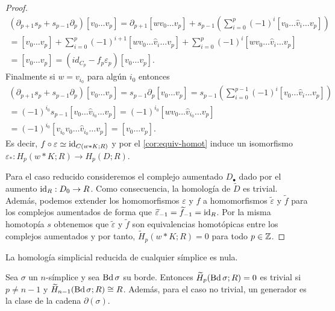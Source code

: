 \begin{proof}
	\begin{gather*}
		(\partial_{p+1}s_{p}+ s_{p-1}\partial_{p})[v_{0}\ldots v_{p}] =\partial_{p+1}
		[wv_{0}\ldots v_{p}]+s_{p-1}\left(\sum_{i=0}^{p}(-1)^{i}[v_{0}\ldots\hat{v}_{i}
		\ldots v_{p}]\right) \\ =[v_{0}\ldots v_{p}]+\sum_{i=0}^{p}(-1)^{i+1}[wv_{0}\ldots
		\hat{v}_{i}\ldots v_{p}]+\sum_{i=0}^{p}(-1)^{i}[wv_{0}\ldots\hat{v}_{i}\ldots
		v_{p}] \\ =[v_{0}\ldots v_{p}]=(id_{C_{p}}-f_{p}\varepsilon_{p})[v_{0}\ldots
		v_{p}].
	\end{gather*}
	Finalmente si \(w = v_{i_0}\) para algún \(i_{0}\) entonces
	\begin{gather*}
		(\partial_{p+1}s_{p}+s_{p-1}\partial_{p})[v_{0}\ldots v_{p}]=s_{p-1}\partial_{p}
		[v_{0}\ldots v_{p}] =s_{p-1}\left( \sum_{i=0}^{p-1}(-1)^{i}[v_{0}\ldots \hat{v}
		_{i}\ldots v_{p}] \right) \\ =(-1)^{i_0}s_{p-1}[v_{0}\ldots \hat{v}_{i_0}\ldots
		v_{p}] =(-1)^{i_0}[wv_{0}\ldots \hat{v}_{i_0}\ldots v_{p}] \\ =(-1)^{i_0}[v_{i_0}
		v_{0}\ldots \hat{v}_{i_0}\ldots v_{p}] =[v_{0}\ldots v_{p}].
	\end{gather*}
	Es decir, \(f \circ \varepsilon \simeq \operatorname{id}_{C(w \ast K;R)}\) y por el
	\autoref{cor:equiv-homot} induce un isomorfismo
	\(\varepsilon_{*}: H_{p}(w \ast K;R) \to H_{p}(D;R)\).
	
	Para el caso reducido consideremos el complejo aumentado \(D_{\bullet}\) dado
	por el aumento \(\operatorname{id}_{R}: D_{0}\to R\). Como consecuencia, la homología de
	\(\widetilde{D}\) es trivial. Además, podemos extender los homomorfismos
	\(\varepsilon\) y \(f\) a homomorfismos \(\widetilde{\varepsilon}\) y
	\(\widetilde{f}\) para los complejos aumentados de forma que
	\(\widetilde{\varepsilon}_{-1}= \widetilde{f}_{-1}= \operatorname{id}_{R}\). Por la misma homotopía
	\(s\) obtenemos que \(\widetilde{\varepsilon}\) y \(\widetilde{f}\) son equivalencias
	homotópicas entre los complejos aumentados y por tanto,
	\(\widetilde{H}_{p}(w \ast K;R) = 0\) para todo \(p \in \mathbb{Z}\).
\end{proof}
\begin{corolario}
	\label{cor:cono-nulo} La homología simplicial reducida de cualquier símplice es
	nula.
\end{corolario}
\begin{corolario}
	Sea \(\sigma\) un \(n\)-símplice y sea \(\operatorname{Bd} \sigma\) su borde. Entonces
	\(\widetilde{H}_{p}(\operatorname{Bd} \sigma;R) = 0\) es trivial si \(p \neq n-1\) y
	\(\widetilde{H}_{n-1}(\operatorname{Bd} \sigma; R) \cong R\). Además, para el caso no trivial,
	un generador es la clase de la cadena \(\partial(\sigma)\).
\end{corolario}
